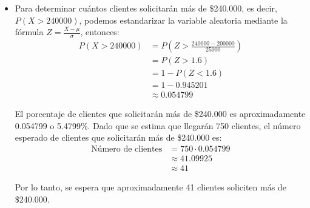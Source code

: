 \documentclass{article}
\theoremstyle{definition}
\theoremstyle{plain}
\theoremstyle{remark}
\begin{document}
\begin{itemize}
El cuartil 3 es \$217.000, lo que significa que el 75\% de los clientes solicitan a lo más \$217.000.

\item Para determinar cuántos clientes solicitarán más de \$240.000, es decir, $P(X > 240000)$, podemos estandarizar la variable aleatoria mediante la fórmula $Z = \frac{X - \mu}{\sigma}$, entonces:
\begin{align*}
P(X > 240000) &= P\left(Z > \frac{240000 - 200000}{25000}\right) \\
&= P(Z > 1.6) \\
&= 1 - P(Z < 1.6) \\
&= 1 - 0.945201 \\
&\approx 0.054799
\end{align*}

El porcentaje de clientes que solicitarán más de \$240.000 es aproximadamente 0.054799 o 5.4799\%. Dado que se estima que llegarán 750 clientes, el número esperado de clientes que solicitarán más de \$240.000 es:
\begin{align*}
\text{Número de clientes} &= 750 \cdot 0.054799 \\
&\approx 41.09925 \\
&\approx 41
\end{align*}

Por lo tanto, se espera que aproximadamente 41 clientes soliciten más de \$240.000.

\end{itemize}
\end{document}
